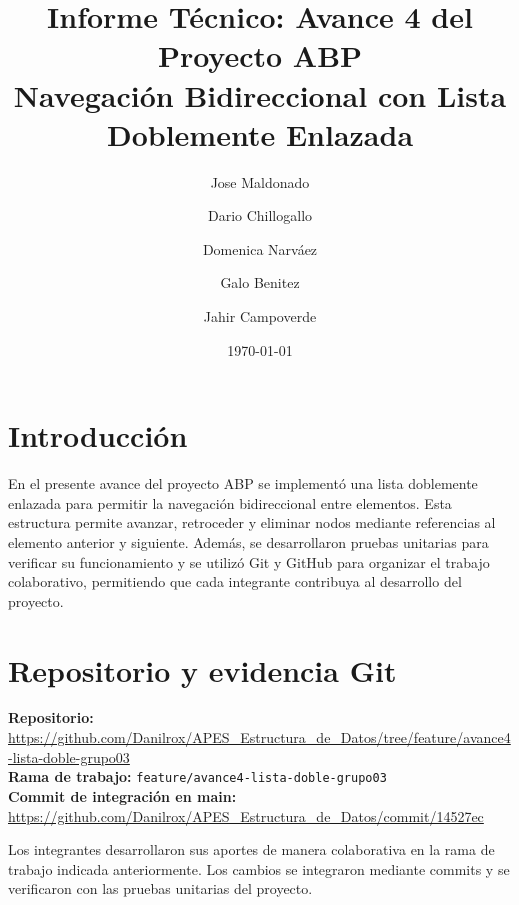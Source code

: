 \documentclass[11pt]{article}
\title{Informe Técnico: Avance 4 del Proyecto ABP\\[0.3em]
       \large Navegación Bidireccional con Lista Doblemente Enlazada}
\author{Jose Maldonado}
\author{Dario Chillogallo}
\author{Domenica Narváez}
\author{Galo Benitez}
\author{Jahir Campoverde}
\affil{Universidad Nacional de Loja\\ Carrera de Computación\\
       Asignatura: Estructura de Datos — Grupo N.° 03}
\date{\today}   %
\begin{document}
\maketitle               %
\thispagestyle{fancy}    %


\section{Introducción}

En el presente avance del proyecto ABP se implementó una lista
doblemente enlazada para permitir la navegación bidireccional
entre elementos. Esta estructura permite avanzar, retroceder
y eliminar nodos mediante referencias al elemento anterior
y siguiente. Además, se desarrollaron pruebas unitarias
para verificar su funcionamiento y se utilizó Git y GitHub
para organizar el trabajo colaborativo, permitiendo que
cada integrante contribuya al desarrollo del proyecto.


\section{Repositorio y evidencia Git}

\textbf{Repositorio:}
\url{https://github.com/Danilrox/APES_Estructura_de_Datos/tree/feature/avance4-lista-doble-grupo03}\\
\textbf{Rama de trabajo:}
\texttt{feature/avance4-lista-doble-grupo03}\\
\noindent\textbf{Commit de integración en main:}
\url{https://github.com/Danilrox/APES_Estructura_de_Datos/commit/14527ec}

Los integrantes desarrollaron sus aportes de manera colaborativa
en la rama de trabajo indicada anteriormente.
Los cambios se integraron mediante commits y se verificaron
con las pruebas unitarias del proyecto.

\end{document}
